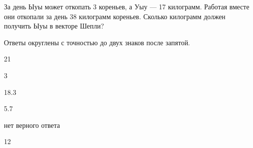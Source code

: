 
\begin{question}
За день Ыуы может откопать 3 кореньев, а Уыу --- 17 килограмм. Работая
вместе они откопали за день 38 килограмм кореньев. Сколько килограмм
должен получить Ыуы в векторе Шепли?

Ответы округлены с точностью до двух знаков после запятой.
\begin{answerlist}
  \item 21
  \item 3
  \item 18.3
  \item 5.7
  \item нет верного ответа
  \item 12
\end{answerlist}
\end{question}


